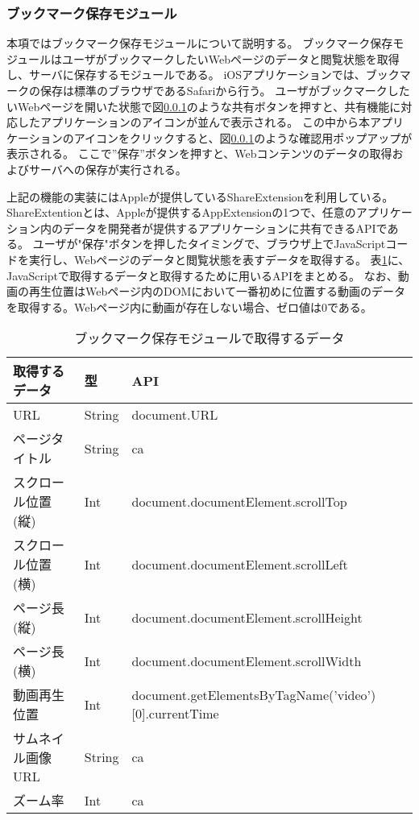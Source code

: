 \subsubsection{ブックマーク保存モジュール}
本項ではブックマーク保存モジュールについて説明する。
ブックマーク保存モジュールはユーザがブックマークしたいWebページのデータと閲覧状態を取得し、サーバに保存するモジュールである。
iOSアプリケーションでは、ブックマークの保存は標準のブラウザであるSafariから行う。
ユーザがブックマークしたいWebページを開いた状態で図\ref{}のような共有ボタンを押すと、共有機能に対応したアプリケーションのアイコンが並んで表示される。
この中から本アプリケーションのアイコンをクリックすると、図\ref{}のような確認用ポップアップが表示される。
ここで”保存”ボタンを押すと、Webコンテンツのデータの取得およびサーバへの保存が実行される。

上記の機能の実装にはAppleが提供しているShareExtension\cite{}を利用している。
ShareExtentionとは、Appleが提供するAppExtension\cite{app-extension}の1つで、任意のアプリケーション内のデータを開発者が提供するアプリケーションに共有できるAPIである。
ユーザが"保存"ボタンを押したタイミングで、ブラウザ上でJavaScriptコードを実行し、Webページのデータと閲覧状態を表すデータを取得する。
表\ref{tb:ios-data-js-api}に、JavaScriptで取得するデータと取得するために用いるAPIをまとめる。
なお、動画の再生位置はWebページ内のDOMにおいて一番初めに位置する動画のデータを取得する。Webページ内に動画が存在しない場合、ゼロ値は0である。

\begin{table}[htbp]
  \label{tb:ios-data-js-api}
  \caption{ブックマーク保存モジュールで取得するデータ}
  \begin{center}
    \begin{tabular}{|l|l|l|}
    \hline
    取得するデータ & 型 & API \\ \hline
    URL & String & document.URL \\ \hline
    ページタイトル & String & ca \\ \hline
    スクロール位置(縦) & Int & document.documentElement.scrollTop \\ \hline
    スクロール位置(横) & Int & document.documentElement.scrollLeft \\ \hline
    ページ長(縦) & Int & document.documentElement.scrollHeight \\ \hline
    ページ長(横) & Int & document.documentElement.scrollWidth \\ \hline
    動画再生位置 & Int & document.getElementsByTagName('video')[0].currentTime \\ \hline
    サムネイル画像URL & String & ca \\ \hline
    ズーム率 & Int & ca \\ \hline
    \end{tabular}
  \end{center}
\end{table}


